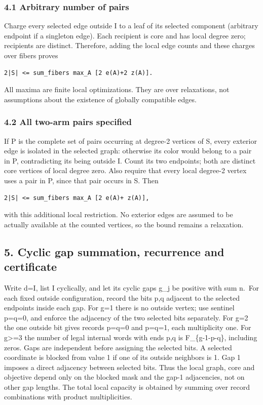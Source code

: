 \documentclass[
  10pt,
]{article}
\begin{document}
\subsubsection{4.1 Arbitrary number of
pairs}\label{arbitrary-number-of-pairs}

Charge every selected edge outside I to a leaf of its selected component
(arbitrary endpoint if a singleton edge). Each recipient is core and has
local degree zero; recipients are distinct. Therefore, adding the local
edge counts and these charges over fibers proves

\begin{verbatim}
2|S| <= sum_fibers max_A [2 e(A)+2 z(A)].
\end{verbatim}

All maxima are finite local optimizations. They are over relaxations,
not assumptions about the existence of globally compatible edges.

\subsubsection{4.2 All two-arm pairs
specified}\label{all-two-arm-pairs-specified}

If P is the complete set of pairs occurring at degree-2 vertices of S,
every exterior edge is isolated in the selected graph: otherwise its
color would belong to a pair in P, contradicting its being outside I.
Count its two endpoints; both are distinct core vertices of local degree
zero. Also require that every local degree-2 vertex uses a pair in P,
since that pair occurs in S. Then

\begin{verbatim}
2|S| <= sum_fibers max_A [2 e(A)+ z(A)],
\end{verbatim}

with this additional local restriction. No exterior edges are assumed to
be actually available at the counted vertices, so the bound remains a
relaxation.

\subsection{5. Cyclic gap summation, recurrence and
certificate}\label{cyclic-gap-summation-recurrence-and-certificate}

Write d=\textbar I\textbar, list I cyclically, and let its cyclic gaps
g\_j be positive with sum n.~For each fixed outside configuration,
record the bits p,q adjacent to the selected endpoints inside each gap.
For g=1 there is no outside vertex; use sentinel p=q=0, and enforce the
adjacency of the two selected bits separately. For g=2 the one outside
bit gives records p=q=0 and p=q=1, each multiplicity one. For
g\textgreater=3 the number of legal internal words with ends p,q is
F\_\{g-1-p-q\}, including zeros. Gaps are independent before assigning
the selected bits. A selected coordinate is blocked from value 1 if one
of its outside neighbors is 1. Gap 1 imposes a direct adjacency between
selected bits. Thus the local graph, core and objective depend only on
the blocked mask and the gap-1 adjacencies, not on other gap lengths.
The total local capacity is obtained by summing over record combinations
with product multiplicities.
\end{document}
